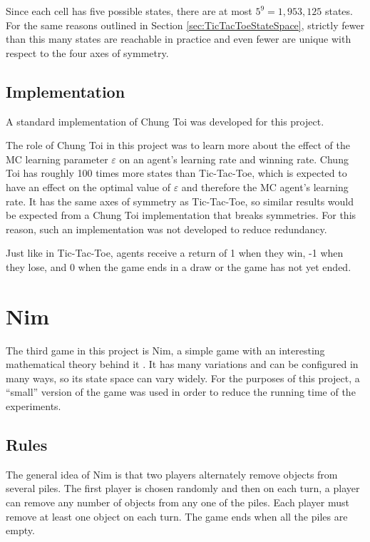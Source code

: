\documentclass[11pt,a4paper,twoside,openright]{report}
\begin{document}
Since each cell has five possible states, there are at most $5^9 = 1,953,125$ states. For the same reasons outlined in Section \ref{sec:TicTacToeStateSpace}, strictly fewer than this many states are reachable in practice and even fewer are unique with respect to the four axes of symmetry.


\subsection{Implementation}

A standard implementation of Chung Toi was developed for this project.

The role of Chung Toi in this project was to learn more about the effect of the MC learning parameter $\varepsilon$ on an agent's learning rate and winning rate. Chung Toi has roughly 100 times more states than Tic-Tac-Toe, which is expected to have an effect on the optimal value of $\varepsilon$ and therefore the MC agent's learning rate. It has the same axes of symmetry as Tic-Tac-Toe, so similar results would be expected from a Chung Toi implementation that breaks symmetries. For this reason, such an implementation was not developed to reduce redundancy.

Just like in Tic-Tac-Toe, agents receive a return of 1 when they win, -1 when they lose, and 0 when the game ends in a draw or the game has not yet ended.


\newpage

\section{Nim}
\label{sec:Nim}

The third game in this project is Nim, a simple game with an interesting mathematical theory behind it \cite{nim-rules}. It has many variations and can be configured in many ways, so its state space can vary widely. For the purposes of this project, a ``small'' version of the game was used in order to reduce the running time of the experiments.


\subsection{Rules}

The general idea of Nim \cite{nim-rules} is that two players alternately remove objects from several piles. The first player is chosen randomly and then on each turn, a player can remove any number of objects from any one of the piles. Each player must remove at least one object on each turn. The game ends when all the piles are empty.
\end{document}
